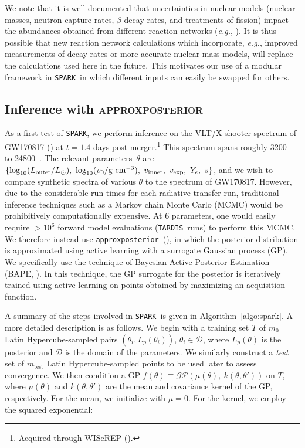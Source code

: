 \documentclass[twocolumn, twocolappendix]{aastex63}
\def\SPARK{\texttt{SPARK}}
\def\TARDIS{\texttt{TARDIS}}
\def\approxposterior{\texttt{approxposterior}}
\def\eg{{\it e.g.}}
\begin{document}
We note that it is well-documented that uncertainties in nuclear models (nuclear masses, neutron capture rates, $\beta$-decay rates, and treatments of fission) impact the abundances obtained from different reaction networks (\textit{e.g.}, \citealt{eichler15, eichler19, barnes16, barnes20, mumpower16, cote18, zhu21, kullmann22b}). It is thus possible that new reaction network calculations which incorporate, \eg, improved measurements of decay rates or more accurate nuclear mass models, will replace the calculations used here in the future. This motivates our use of a modular framework in \SPARK~in which different inputs can easily be swapped for others.


\subsection{Inference with \textsc{approxposterior}}\label{ssc:inference}

As a first test of \SPARK, we perform inference on the VLT/X-shooter spectrum of GW170817 (\citealt{pian17, smartt17}) at $t=1.4$ days post-merger.\footnote{Acquired through WISeREP (\citealt{yaron12}).} This spectrum spans roughly 3200~\text{\AA} to 24800~\text{\AA}. The relevant parameters~$\theta$ are $\{\log_{10}(L_{\mathrm{outer}}/L_{\odot}),~\log_{10}(\rho_0/\mathrm{g~cm^{-3}}),~v_{\mathrm{inner}},~v_{\mathrm{exp}},\\~Y_e,~s\}$, and we wish to compare synthetic spectra of various $\theta$ to the spectrum of GW170817. However, due to the considerable run times for each radiative transfer run, traditional inference techniques such as a Markov chain Monte Carlo (MCMC) would be prohibitively computationally expensive. At 6 parameters, one would easily require $>10^6$ forward model evaluations (\TARDIS~runs) to perform this MCMC. We therefore instead use \approxposterior~(\citealt{fleming18, fleming20}), in which the posterior distribution is approximated using active learning with a surrogate Gaussian process (GP). We specifically use the technique of Bayesian Active Posterior Estimation (BAPE, \citealt{kandasamy17}). In this technique, the GP surrogate for the posterior is iteratively trained using active learning on points obtained by maximizing an acquisition function.


A summary of the steps involved in \SPARK~is given in Algorithm~\ref{algo:spark}. A more detailed description is as follows. We begin with a training set $T$ of $m_0$ Latin Hypercube-sampled pairs $(\theta_i, L_p (\theta_i))$, $\theta_i \in \mathcal{D}$, where $L_p (\theta)$ is the posterior and $\mathcal{D}$ is the domain of the parameters. We similarly construct a \textit{test} set of $m_{\mathrm{test}}$ Latin Hypercube-sampled points to be used later to assess convergence. We then condition a GP $f(\theta) \equiv \mathcal{GP} (\mu(\theta),~k(\theta, \theta'))$ on $T$, where $\mu(\theta)$ and $k(\theta, \theta')$ are the mean and covariance kernel of the GP, respectively. For the mean, we initialize with $\mu=0$. For the kernel, we employ the squared exponential:
\end{document}
